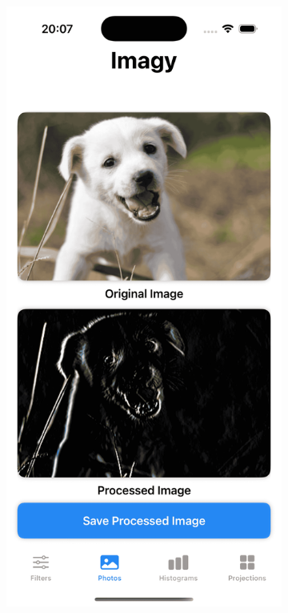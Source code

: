 \documentclass[a4paper]{article}
\begin{document}
\begin{figure}[H]
\begin{subfigure}{0.2\textwidth}
        \label{fig:custom_vertical}
    \end{subfigure}
    \hfill
    \begin{subfigure}{0.2\textwidth}
        \centering
        \includegraphics[width=\linewidth]{images/dog_custom_vertical.png}

\end{subfigure}
\end{figure}
\end{document}
